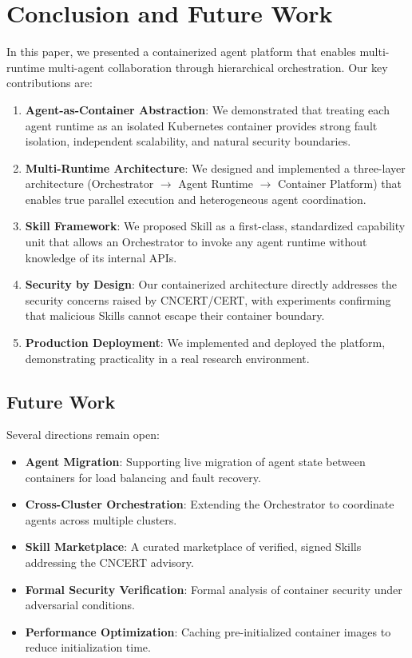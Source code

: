 \section{Conclusion and Future Work}
\label{sec:conclusion}

In this paper, we presented a containerized agent platform that enables multi-runtime multi-agent collaboration through hierarchical orchestration. Our key contributions are:

\begin{enumerate}
    \item \textbf{Agent-as-Container Abstraction}: We demonstrated that treating each agent runtime as an isolated Kubernetes container provides strong fault isolation, independent scalability, and natural security boundaries.
    
    \item \textbf{Multi-Runtime Architecture}: We designed and implemented a three-layer architecture (Orchestrator $\rightarrow$ Agent Runtime $\rightarrow$ Container Platform) that enables true parallel execution and heterogeneous agent coordination.
    
    \item \textbf{Skill Framework}: We proposed Skill as a first-class, standardized capability unit that allows an Orchestrator to invoke any agent runtime without knowledge of its internal APIs.
    
    \item \textbf{Security by Design}: Our containerized architecture directly addresses the security concerns raised by CNCERT/CERT, with experiments confirming that malicious Skills cannot escape their container boundary.
    
    \item \textbf{Production Deployment}: We implemented and deployed the platform, demonstrating practicality in a real research environment.
\end{enumerate}

\subsection{Future Work}
Several directions remain open:

\begin{itemize}
    \item \textbf{Agent Migration}: Supporting live migration of agent state between containers for load balancing and fault recovery.
    \item \textbf{Cross-Cluster Orchestration}: Extending the Orchestrator to coordinate agents across multiple clusters.
    \item \textbf{Skill Marketplace}: A curated marketplace of verified, signed Skills addressing the CNCERT advisory.
    \item \textbf{Formal Security Verification}: Formal analysis of container security under adversarial conditions.
    \item \textbf{Performance Optimization}: Caching pre-initialized container images to reduce initialization time.
\end{itemize}

